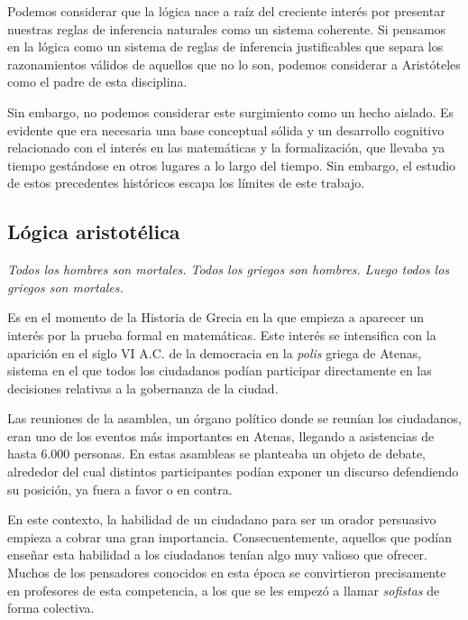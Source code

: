 \documentclass{article}
\begin{document}
Podemos considerar que la lógica nace a raíz del creciente interés por presentar nuestras reglas de inferencia naturales como un sistema coherente. Si pensamos en la lógica como un sistema de reglas de inferencia justificables que separa los razonamientos válidos de aquellos que no lo son, podemos considerar a Aristóteles como el padre de esta disciplina\cite{moravcsik2004logic}. 

Sin embargo, no podemos considerar este surgimiento como un hecho aislado. Es evidente que era necesaria una base conceptual sólida y un desarrollo cognitivo relacionado con el interés en las matemáticas y la formalización, que llevaba ya tiempo gestándose en otros lugares a lo largo del tiempo. Sin embargo, el estudio de estos precedentes históricos escapa los límites de este trabajo.

\subsection{Lógica aristotélica}

\begin{displayquote}
    \textit{Todos los hombres son mortales. Todos los griegos son hombres. Luego todos los griegos son mortales.}
\end{displayquote}

Es en el momento de la Historia de Grecia en la que empieza a aparecer un interés por la prueba formal en matemáticas. Este interés se intensifica con la aparición en el siglo VI A.C. de la democracia en la \textit{polis} griega de Atenas, sistema en el que todos los ciudadanos podían participar directamente en las decisiones relativas a la gobernanza de la ciudad.

Las reuniones de la asamblea, un órgano político donde se reunían los ciudadanos, eran uno de los eventos más importantes en Atenas, llegando a asistencias de hasta 6.000 personas. En estas asambleas se planteaba un objeto de debate, alrededor del cual distintos participantes podían exponer un discurso defendiendo su posición, ya fuera a favor o en contra.

En este contexto, la habilidad de un ciudadano para ser un orador persuasivo empieza a cobrar una gran importancia. Consecuentemente, aquellos que podían enseñar esta habilidad a los ciudadanos tenían algo muy valioso que ofrecer. Muchos de los pensadores conocidos en esta época se convirtieron precisamente en profesores de esta competencia, a los que se les empezó a llamar \textit{sofistas} de forma colectiva.
\end{document}
